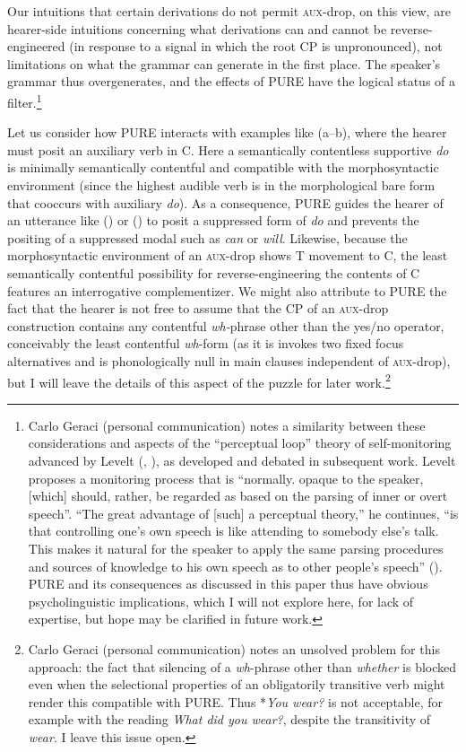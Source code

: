 \documentclass[output=paper]{langscibook}
\begin{document}
Our intuitions that certain derivations do not permit \textsc{aux}-drop, on this view, are hearer-side intuitions concerning what derivations can and cannot be reverse-engineered (in response to a signal in which the root CP is unpronounced), not limitations on what the grammar can generate in the first place. The speaker's grammar thus overgenerates, and the effects of PURE have the logical status of a filter.\footnote{Carlo Geraci (personal communication) notes a similarity between these considerations and aspects of the “perceptual loop” theory of self-monitoring advanced by Levelt (\citeyear[96]{Levelt:1983aa}, \citeyear[chapter 12]{Levelt:1989aa}), as developed and debated in subsequent work. Levelt proposes a monitoring process that is “normally. opaque to the speaker, {[}which{]} should, rather, be regarded as based on the parsing of inner or overt speech”. “The great advantage of {[}such{]} a perceptual theory,” he continues, “is that controlling one’s own speech is like attending to somebody else’s talk. This makes it natural for the speaker to apply the same parsing procedures and sources of knowledge to his own speech as to other people’s speech” (\citealt[96--97]{Levelt:1983aa}). PURE and its consequences as discussed in this paper thus have obvious psycholinguistic implications, which I will not explore here, for lack of expertise, but hope may be clarified in future work.}

Let us consider how PURE interacts with examples like (a--b), where the hearer must posit an auxiliary verb in C. Here a semantically contentless supportive \textit{do} is minimally semantically contentful and compatible with the morphosyntactic environment (since the highest audible verb is in the morphological bare form that cooccurs with auxiliary \textit{do}). As a consequence, PURE guides the hearer of an utterance like () or () to posit a suppressed form of \textit{do} and prevents the positing of a suppressed modal such as \textit{can} or \textit{will}. Likewise, because the morphosyntactic environment of an \textsc{aux}-drop shows T movement to C, the least semantically contentful possibility for reverse-engineering the contents of C features an interrogative complementizer. We might also attribute to PURE the fact that the hearer is not free to assume that the CP of an \textsc{aux-}drop construction contains any contentful \textit{wh-}phrase other than the yes/no operator, conceivably the least contentful \textit{wh}-form (as it is invokes two fixed focus alternatives and is phonologically null in main clauses independent of \textsc{aux-}drop), but I will leave the details of this aspect of the puzzle for later work.\footnote{Carlo Geraci (personal communication) notes an unsolved problem for this approach: the fact that silencing of a \textit{wh}-phrase other than \textit{whether} is blocked even when the selectional properties of an obligatorily transitive verb might render this compatible with PURE. Thus *\textit{You wear?} is not acceptable, for example with the reading \textit{What did you wear?}, despite the transitivity of \textit{wear}. I leave this issue open.} 
\end{document}
